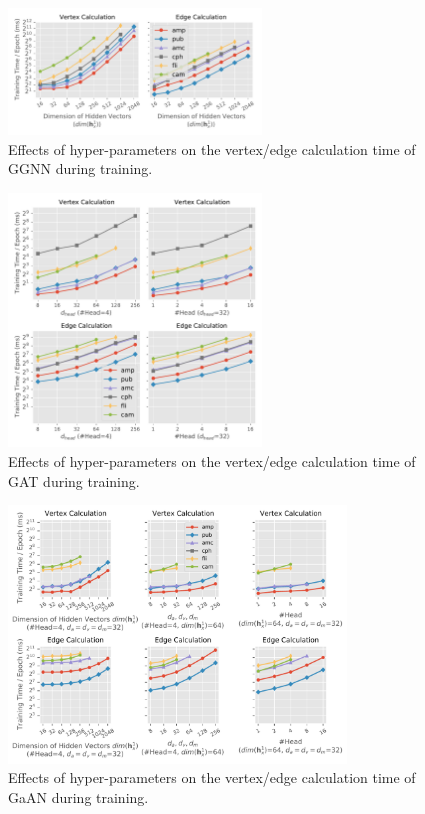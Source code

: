 \begin{figure}[H]
    \centering
    \includegraphics[width=0.6\textwidth]{figs/experiments/exp_hyperparameter_on_vertex_edge_phase_time_ggnn.pdf}
    \caption{Effects of hyper-parameters on the vertex/edge calculation time of GGNN during training.}
    \label{fig:exp_hyperparameter_on_vertex_edge_phase_time_ggnn}
\end{figure}

\begin{figure}[H]
    \centering
    \includegraphics[width=0.6\textwidth]{figs/experiments/exp_hyperparameter_on_vertex_edge_phase_time_gat.pdf}
    \caption{Effects of hyper-parameters on the vertex/edge calculation time of GAT during training.}
    \label{fig:exp_hyperparameter_on_vertex_edge_phase_time_gat}
\end{figure}

\begin{figure}[H]
    \centering
    \includegraphics[width=0.8\textwidth]{figs/experiments/exp_hyperparameter_on_vertex_edge_phase_time_gaan.pdf}
    \caption{Effects of hyper-parameters on the vertex/edge calculation time of GaAN during training.}
    \label{fig:exp_hyperparameter_on_vertex_edge_phase_time_gaan}
\end{figure}

